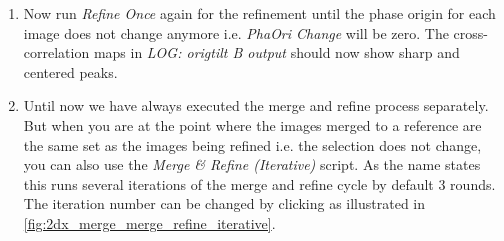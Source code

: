 \begin{enumerate}
	\item Now run \textit{Refine Once} again for the refinement until the phase origin for each image does not change anymore i.e. \textit{PhaOri Change} will be zero. The cross-correlation maps in \textit{LOG: origtilt B output} should now show sharp and centered peaks.
	\item Until now we have always executed the merge and refine process separately. But when you are at the point where the images merged to a reference are the same set as the images being refined i.e. the selection does not change, you can also use the \textit{Merge \& Refine (Iterative)}  script. As the name states this runs several iterations of the merge and refine cycle by default 3 rounds. The iteration number can be changed by clicking as illustrated in \autoref{fig:2dx_merge_merge_refine_iterative}.
		

\end{enumerate}
